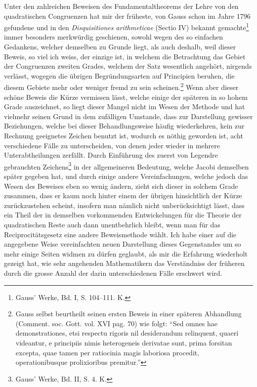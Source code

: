 \documentclass[11pt]{article}
\begin{document}
Unter den zahlreichen Beweisen des Fundamentaltheorems der Lehre von den quadratischen Congruenzen hat mir der früheste, von Gauss schon im Jahre 1796 gefundene und in den \emph{Disquisitiones arithmeticae} (Sectio IV) bekannt gemachte\footnote{Gauss' Werke, Bd. I, S. 104--111. K.} immer besonders merkwürdig geschienen, sowohl wegen des so einfachen Gedankens, welcher demselben zu Grunde liegt, als auch deshalb, weil dieser Beweis, so viel ich weiss, der einzige ist, in welchem die Betrachtung das Gebiet der Congruenzen zweiten Grades, welchem der Satz wesentlich angehört, nirgends verlässt, wogegen die übrigen Begründungsarten auf Principien beruhen, die diesem Gebiete mehr oder weniger fremd zu sein scheinen.\footnote{Gauss selbst beurtheilt seinen ersten Beweis in einer späteren Abhandlung (Comment. soc. Gott. vol. XVI pag. 70) wie folgt: ``Sed omnes hae demonstrationes, etsi respectu rigoris nil desiderandum relinquent, quaeri videantur, e principiis nimis heterogeneis derivatae sunt, prima forsitan excepta, quae tamen per ratiocinia magis laboriosa procedit, operationibusque prolixioribus premitur.''} Wenn aber dieser schöne Beweis die Kürze vermissen lässt, welche einige der späteren in so hohem Grade auszeichnet, so liegt dieser Mangel nicht im Wesen der Methode und hat vielmehr seinen Grund in dem zufälligen Umstande, dass zur Darstellung gewisser Beziehungen, welche bei dieser Behandlungsweise häufig wiederkehren, kein zur Rechnung geeignetes Zeichen benutzt ist, wodurch es nöthig geworden ist, acht verschiedene Fälle zu unterscheiden, von denen jeder wieder in mehrere Unterabtheilungen zerfällt. Durch Einführung des zuerst von Legendre gebrauchten Zeichens\footnote{Gauss' Werke, Bd. II, S. 4. K.} in der allgemeineren Bedeutung, welche Jacobi demselben später gegeben hat, und durch einige andere Vereinfachungen, welche jedoch das Wesen des Beweises eben so wenig ändern, zieht sich dieser in solchem Grade zusammen, dass er kaum noch hinter einem der übrigen hinsichtlich der Kürze zurückzustehen scheint, insofern man nämlich nicht unberücksichtigt lässt, dass ein Theil der in demselben vorkommenden Entwickelungen für die Theorie der quadratischen Reste auch dann unentbehrlich bleibt, wenn man für das Reciprocitätsgesetz eine andere Beweismethode wählt. Ich habe einer auf die angegebene Weise vereinfachten neuen Darstellung dieses Gegenstandes um so mehr einige Seiten widmen zu dürfen geglaubt, als mir die Erfahrung wiederholt gezeigt hat, wie sehr angehenden Mathematikern das Verständniss der früheren durch die grosse Anzahl der darin unterschiedenen Fälle erschwert wird.
\end{document}
